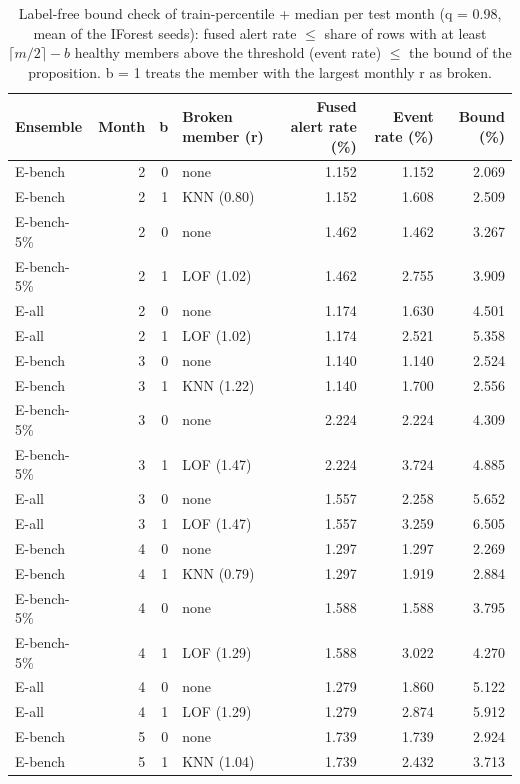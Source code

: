 \begin{table}[t]
\centering
\scriptsize
\setlength{\tabcolsep}{4pt}
\caption{Label-free bound check of train-percentile + median per test month (q = 0.98, mean of the IForest seeds): fused alert rate $\le$ share of rows with at least $\lceil m/2\rceil - b$ healthy members above the threshold (event rate) $\le$ the bound of the proposition. b = 1 treats the member with the largest monthly r as broken.}
\label{tab:bound-check}
\begin{tabular}{lrrlrrr}
\toprule
Ensemble & Month & b & Broken member (r) & Fused alert rate (\%) & Event rate (\%) & Bound (\%) \\
\midrule
E-bench & 2 & 0 & none & 1.152 & 1.152 & 2.069 \\
E-bench & 2 & 1 & KNN (0.80) & 1.152 & 1.608 & 2.509 \\
E-bench-5\% & 2 & 0 & none & 1.462 & 1.462 & 3.267 \\
E-bench-5\% & 2 & 1 & LOF (1.02) & 1.462 & 2.755 & 3.909 \\
E-all & 2 & 0 & none & 1.174 & 1.630 & 4.501 \\
E-all & 2 & 1 & LOF (1.02) & 1.174 & 2.521 & 5.358 \\
E-bench & 3 & 0 & none & 1.140 & 1.140 & 2.524 \\
E-bench & 3 & 1 & KNN (1.22) & 1.140 & 1.700 & 2.556 \\
E-bench-5\% & 3 & 0 & none & 2.224 & 2.224 & 4.309 \\
E-bench-5\% & 3 & 1 & LOF (1.47) & 2.224 & 3.724 & 4.885 \\
E-all & 3 & 0 & none & 1.557 & 2.258 & 5.652 \\
E-all & 3 & 1 & LOF (1.47) & 1.557 & 3.259 & 6.505 \\
E-bench & 4 & 0 & none & 1.297 & 1.297 & 2.269 \\
E-bench & 4 & 1 & KNN (0.79) & 1.297 & 1.919 & 2.884 \\
E-bench-5\% & 4 & 0 & none & 1.588 & 1.588 & 3.795 \\
E-bench-5\% & 4 & 1 & LOF (1.29) & 1.588 & 3.022 & 4.270 \\
E-all & 4 & 0 & none & 1.279 & 1.860 & 5.122 \\
E-all & 4 & 1 & LOF (1.29) & 1.279 & 2.874 & 5.912 \\
E-bench & 5 & 0 & none & 1.739 & 1.739 & 2.924 \\
E-bench & 5 & 1 & KNN (1.04) & 1.739 & 2.432 & 3.713 \\

\end{tabular}
\end{table}

